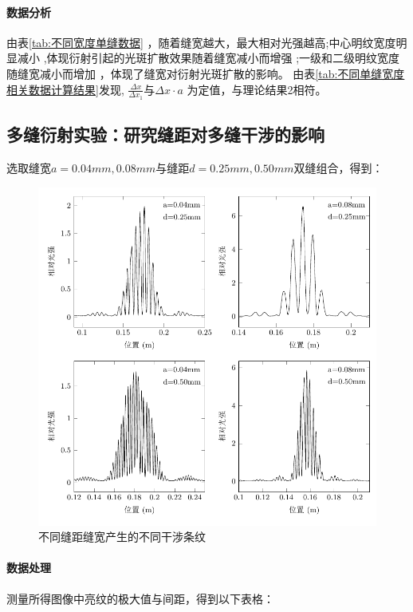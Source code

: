 \documentclass[a4paper]{../phyreport}
\begin{document}
\paragraph{数据分析}
由表\ref{tab:不同宽度单缝数据} ，随着缝宽越大，最大相对光强越高;中心明纹宽度明显减小
,体现衍射引起的光斑扩散效果随着缝宽减小而增强
;一级和二级明纹宽度随缝宽减小而增加
，体现了缝宽对衍射光斑扩散的影响。
由表\ref{tab:不同单缝宽度相关数据计算结果}发现,
$\frac{\Delta x}{\Delta x_1}$与$ \Delta x \cdot a$ 为定值，与理论结果2相符。
\subsection{多缝衍射实验：研究缝距对多缝干涉的影响}

选取缝宽$a=0.04mm, 0.08mm$与缝距$d=0.25mm, 0.50mm$双缝组合，得到：

\begin{figure}[H]
  \centering
  \includegraphics[]{fig/多缝/双峰改变ad4图.pdf}
  \caption{不同缝距缝宽产生的不同干涉条纹} \label{缝间距}
\end{figure}

\paragraph{数据处理}
测量所得图像中亮纹的极大值与间距，得到以下表格：
\end{document}

